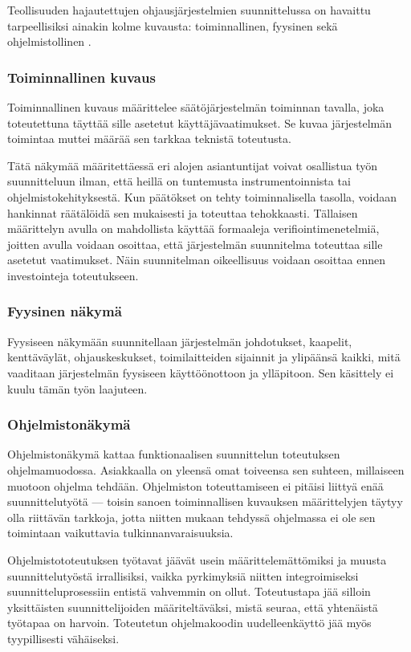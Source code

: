 \documentclass[finnish,12pt]{article}
\begin{document}
Teollisuuden hajautettujen ohjausjärjestelmien suunnittelussa on havaittu
tarpeellisiksi ainakin kolme kuvausta: toiminnallinen, fyysinen sekä ohjelmistollinen \cite{RefWorks:38}.

		\subsubsection{Toiminnallinen kuvaus}

Toiminnallinen kuvaus määrittelee säätöjärjestelmän toiminnan tavalla, joka toteutettuna täyttää sille asetetut käyttäjävaatimukset.
Se kuvaa järjestelmän toimintaa muttei määrää sen tarkkaa teknistä toteutusta. \cite{RefWorks:60}

Tätä näkymää määritettäessä eri alojen asiantuntijat voivat osallistua työn suunnitteluun ilman, että heillä on tuntemusta instrumentoinnista tai ohjelmistokehityksestä.
Kun päätökset on tehty toiminnalisella tasolla, voidaan hankinnat räätälöidä sen mukaisesti ja toteuttaa tehokkaasti.
Tällaisen määrittelyn avulla on mahdollista käyttää formaaleja verifiointimenetelmiä, joitten avulla
voidaan osoittaa, että järjestelmän suunnitelma toteuttaa sille asetetut vaatimukset.
Näin suunnitelman oikeellisuus voidaan osoittaa ennen investointeja toteutukseen. \cite{RefWorks:41}

		\subsubsection{Fyysinen näkymä}

Fyysiseen näkymään suunnitellaan järjestelmän johdotukset, kaapelit, kenttäväylät,
ohjauskeskukset, toimilaitteiden sijainnit ja ylipäänsä kaikki, mitä vaaditaan 
järjestelmän fyysiseen käyttöönottoon ja ylläpitoon. Sen käsittely ei kuulu tämän työn laajuteen.

		\subsubsection{Ohjelmistonäkymä}

Ohjelmistonäkymä kattaa funktionaalisen suunnittelun toteutuksen ohjelmamuodossa.
Asiakkaalla on yleensä omat toiveensa sen suhteen, millaiseen muotoon ohjelma tehdään.
Ohjelmiston toteuttamiseen ei pitäisi liittyä enää suunnittelutyötä --- toisin sanoen toiminnallisen kuvauksen määrittelyjen täytyy olla riittävän tarkkoja, jotta niitten mukaan tehdyssä ohjelmassa ei ole sen toimintaan vaikuttavia tulkinnanvaraisuuksia.

Ohjelmistototeutuksen työtavat jäävät usein määrittelemättömiksi ja muusta suunnittelutyöstä irrallisiksi,
vaikka pyrkimyksiä niitten integroimiseksi suunnitteluprosessiin entistä vahvemmin on ollut.
Toteutustapa jää silloin yksittäisten suunnittelijoiden määriteltäväksi, mistä seuraa, että yhtenäistä työtapaa on harvoin.
Toteutetun ohjelmakoodin uudelleenkäyttö jää myös tyypillisesti vähäiseksi. \cite{RefWorks:42}
\end{document}
